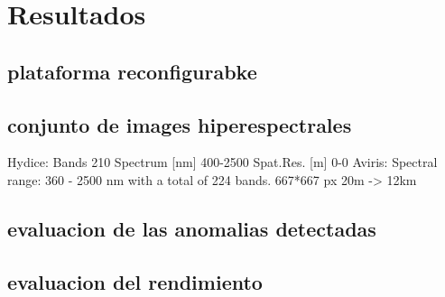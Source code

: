 \cleardoublepage
\chapter{Resultados}
\label{makereference}
\section{plataforma reconfigurabke}
\section{conjunto de images hiperespectrales}

Hydice: Bands 	210
Spectrum [nm] 	400-2500
Spat.Res. [m] 	0-0 
Aviris:
Spectral range: 360 - 2500 nm with a total of 224 bands. 
667*667 px
20m -> 12km
\section{evaluacion de las anomalias detectadas}
\section{evaluacion del rendimiento}